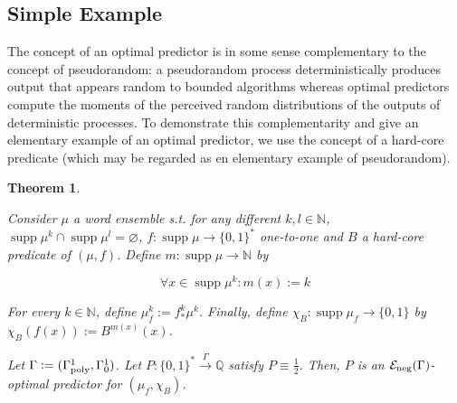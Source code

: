 \documentclass{article}
\numberwithin{equation}{section}
\theoremstyle{definition}
\theoremstyle{plain}
\newtheorem{theorem}{Theorem}[section]
\newcommand{\Bool}{\{0,1\}}
\newcommand{\Words}{{\Bool^*}}
\DeclareMathOperator{\Supp}{supp}
\newcommand{\Nats}{\mathbb{N}}
\newcommand{\Rats}{\mathbb{Q}}
\newcommand{\Fall}{\mathcal{E}}
\newcommand{\Scheme}{\xrightarrow{\Gamma}}
\begin{document}
\subsection{Simple Example}
\label{sec:fundamentals__one_way}

The concept of an optimal predictor is in some sense complementary to the concept of pseudorandom: a pseudorandom process deterministically produces output that appears random to bounded algorithms whereas optimal predictors compute the moments of the perceived random distributions of the outputs of deterministic processes. To demonstrate this complementarity and give an elementary example of an optimal predictor, we use the concept of a hard-core predicate (which may be regarded as en elementary example of pseudorandom).

\begin{theorem}
\label{thm:hard_core}

Consider $\mu$ a word ensemble s.t. for any different $k,l \in \Nats$, ${\Supp \mu^k \cap \Supp \mu^l = \varnothing}$, ${f: \Supp \mu \rightarrow \Words}$ one-to-one and $B$ a hard-core predicate of $(\mu,f)$. Define ${m: \Supp \mu \rightarrow \Nats}$ by 

\[\forall x \in \Supp \mu^k: m(x):=k\]

For every $k \in \Nats$, define ${\mu_f^k:=f_*^k\mu^k}$.  Finally, define ${\chi_B: \Supp \mu_f \rightarrow \Bool}$ by ${\chi_B(f(x)):=B^{m(x)}(x)}$.

Let $\Gamma:=(\Gamma_{\textnormal{poly}}^1,\Gamma_0^1)$. Let $P: \Words \Scheme \Rats$ satisfy $P \equiv \frac{1}{2}$. Then, $P$ is an $\Fall_{\textnormal{neg}}(\Gamma)$-optimal predictor for $(\mu_f, \chi_B)$.

\end{theorem}
\end{document}
